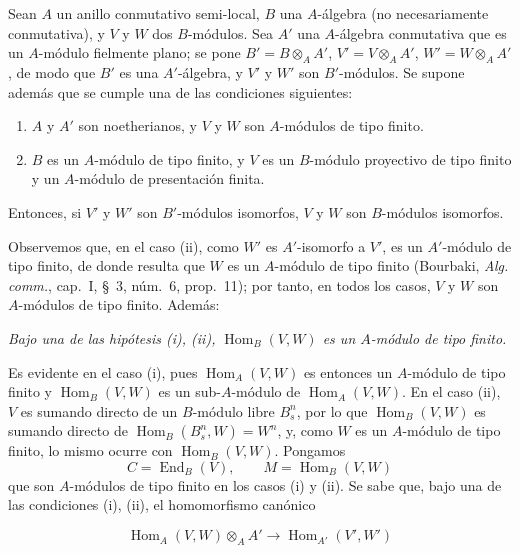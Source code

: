 \begin{proposition}[2.5.8]
\label{IV.2.5.8-fr}
Sean $A$ un anillo conmutativo semi-local, $B$ una $A$-álgebra (no
necesariamente conmutativa), y $V$ y $W$ dos $B$-módulos. Sea $A'$ una
$A$-álgebra conmutativa que es un $A$-módulo \textup{fielmente plano}; se pone $B'=B\otimes_A A'$, $V'=V\otimes_A A'$, $W'=W\otimes_A A'$, de modo que $B'$ es una $A'$-álgebra, y $V'$ y $W'$ son $B'$-módulos.
Se supone además que se cumple una de las condiciones siguientes:
\begin{enumerate}
\item[\textup{(i)}] $A$ y $A'$ son noetherianos, y $V$ y $W$ son $A$-módulos de
tipo finito.
\item[\textup{(ii)}] $B$ es un $A$-módulo de tipo finito, y $V$ es un $B$-módulo
proyectivo de tipo finito y un $A$-módulo de presentación finita.
\end{enumerate}
Entonces, si $V'$ y $W'$ son $B'$-módulos isomorfos, $V$ y $W$ son
$B$-módulos isomorfos.
\end{proposition}

Observemos que, en el caso (ii), como $W'$ es $A'$-isomorfo a $V'$, es un
$A'$-módulo de tipo finito, de donde resulta que $W$ es un $A$-módulo de tipo
finito (Bourbaki, \emph{Alg. comm.}, cap.~I, \S~3,
núm.~6, prop.~11); por tanto, en todos los casos, $V$ y $W$
son $A$-módulos de tipo finito. Además:

\begin{env}[2.5.8.1]
\label{IV.2.5.8.1-fr}
\itshape Bajo una de las hipótesis \textup{(i), (ii)}, $\operatorname{Hom}_B(V,W)$ es un
$A$-módulo de tipo finito.
\end{env}

Es evidente en el caso (i), pues $\operatorname{Hom}_A(V,W)$ es entonces un
$A$-módulo de tipo finito y $\operatorname{Hom}_B(V,W)$ es un sub-$A$-módulo
de $\operatorname{Hom}_A(V,W)$. En el caso (ii), $V$ es sumando directo de un
$B$-módulo libre $B_s^n$, por lo que $\operatorname{Hom}_B(V,W)$ es sumando
directo de $\operatorname{Hom}_B(B_s^n,W)=W^n$, y, como $W$ es un $A$-módulo de
tipo finito, lo mismo ocurre con $\operatorname{Hom}_B(V,W)$. Pongamos
\[
C=\operatorname{End}_B(V),\qquad M=\operatorname{Hom}_B(V,W)
\]
que son $A$-módulos de tipo finito en los casos (i) y (ii). Se sabe que, bajo
una de las condiciones (i), (ii), el homomorfismo canónico

\begin{env}[2.5.8.2]
\label{IV.2.5.8.2-fr}
\[
\operatorname{Hom}_A(V,W)\otimes_A A'\longrightarrow
\operatorname{Hom}_{A'}(V',W')
\]
\end{env}

